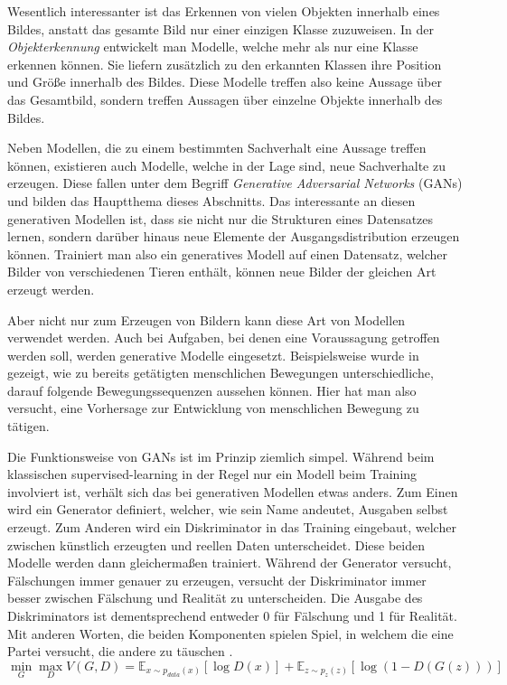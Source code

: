 \documentclass{hsflensburg}
\begin{document}
  Wesentlich interessanter ist das Erkennen von vielen Objekten innerhalb eines
  Bildes, anstatt das gesamte Bild nur einer einzigen Klasse zuzuweisen. In der
  \textit{Objekterkennung} entwickelt man Modelle, welche mehr als nur eine
  Klasse erkennen können. Sie liefern zusätzlich zu den erkannten Klassen ihre
  Position und Größe innerhalb des Bildes. Diese Modelle treffen also keine
  Aussage über das Gesamtbild, sondern treffen Aussagen über einzelne Objekte
  innerhalb des Bildes.

  Neben Modellen, die zu einem bestimmten Sachverhalt eine Aussage treffen
  können, existieren auch Modelle, welche in der Lage sind, neue Sachverhalte zu
  erzeugen. Diese fallen unter dem Begriff \textit{Generative Adversarial
  Networks} (GANs) und bilden das Hauptthema dieses Abschnitts. Das interessante
  an diesen generativen Modellen ist, dass sie nicht nur die Strukturen eines
  Datensatzes lernen, sondern darüber hinaus neue Elemente der
  Ausgangsdistribution erzeugen können. Trainiert man also ein generatives
  Modell auf einen Datensatz, welcher Bilder von verschiedenen Tieren enthält,
  können neue Bilder der gleichen Art erzeugt werden.
  
  Aber nicht nur zum Erzeugen von Bildern kann diese Art von Modellen verwendet
  werden. Auch bei Aufgaben, bei denen eine Voraussagung getroffen werden soll,
  werden generative Modelle eingesetzt. Beispielsweise wurde in
  \cite{barsoum2017hpgan} gezeigt, wie zu bereits getätigten menschlichen
  Bewegungen unterschiedliche, darauf folgende Bewegungssequenzen aussehen
  können. Hier hat man also versucht, eine Vorhersage zur Entwicklung von
  menschlichen Bewegung zu tätigen.

  Die Funktionsweise von GANs ist im Prinzip ziemlich simpel. Während beim
  klassischen supervised-learning in der Regel nur ein Modell beim Training
  involviert ist, verhält sich das bei generativen Modellen etwas anders. Zum
  Einen wird ein Generator definiert, welcher, wie sein Name andeutet, Ausgaben
  selbst erzeugt. Zum Anderen wird ein Diskriminator in das Training eingebaut,
  welcher zwischen künstlich erzeugten und reellen Daten unterscheidet. Diese
  beiden Modelle werden dann gleichermaßen trainiert. Während der Generator
  versucht, Fälschungen immer genauer zu erzeugen, versucht der Diskriminator
  immer besser zwischen Fälschung und Realität zu unterscheiden. Die
  Ausgabe des Diskriminators ist dementsprechend entweder 0 für Fälschung und 1
  für Realität. Mit anderen Worten, die beiden Komponenten spielen Spiel, in
  welchem die eine Partei versucht, die andere zu täuschen
  \cite{goodfellow2014generative}.
  \[
    \min_G \max_D V(G, D) = \mathbb{E}_{x \sim p_{data}(x)}\left[ \log D(x) \right] + \mathbb{E}_{z \sim p_z(z)}\left[ \log (1 - D(G(z))) \right]
  \]
\end{document}
